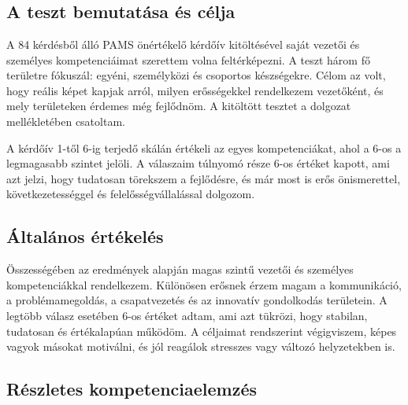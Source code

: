 \chapter{\Introspection}
\section{A teszt bemutatása és célja}

A 84 kérdésből álló PAMS önértékelő kérdőív kitöltésével saját vezetői 
és személyes kompetenciáimat szerettem volna feltérképezni.
A teszt három fő területre fókuszál: egyéni, személyközi és csoportos készségekre.
Célom az volt, hogy reális képet kapjak arról, milyen erősségekkel rendelkezem vezetőként, 
és mely területeken érdemes még fejlődnöm. A kitöltött tesztet a dolgozat mellékletében csatoltam.

A kérdőív 1-től 6-ig terjedő skálán értékeli az egyes kompetenciákat, ahol a 6-os a legmagasabb szintet jelöli.
A válaszaim túlnyomó része 6-os értéket kapott, ami azt jelzi, hogy tudatosan törekszem a fejlődésre, 
és már most is erős önismerettel, következetességgel és felelősségvállalással dolgozom.

\section{Általános értékelés}

Összességében az eredmények alapján magas szintű vezetői és személyes kompetenciákkal rendelkezem.
Különösen erősnek érzem magam a kommunikáció, a problémamegoldás, a csapatvezetés és az innovatív gondolkodás területein.
A legtöbb válasz esetében 6-os értéket adtam, ami azt tükrözi, hogy stabilan, tudatosan és értékalapúan működöm.
A céljaimat rendszerint végigviszem, képes vagyok másokat motiválni, és jól reagálok stresszes vagy változó helyzetekben is.

\section{Részletes kompetenciaelemzés}

